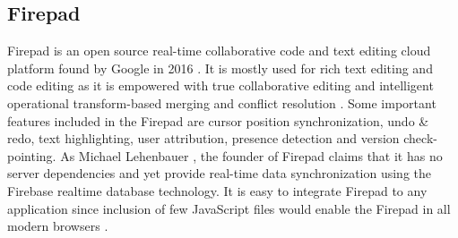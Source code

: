 \subsection{Firepad}

Firepad is an open source real-time collaborative code and text editing cloud platform found by Google in 2016 \cite{hid-sp18-409-www-firepad}.  It is mostly used for rich text editing and code editing as it is empowered with true collaborative editing and intelligent operational transform-based merging and conflict resolution \cite{hid-sp18-409-www-firepad-wikipedia}. Some important features included in the Firepad are cursor position synchronization, undo & redo, text highlighting, user attribution, presence detection and version check-pointing. As Michael Lehenbauer \cite{hid-sp18-409-www-firepad}, the founder of Firepad claims that it has no server dependencies and yet provide real-time data synchronization using the Firebase realtime database technology.  It is easy to integrate Firepad to any application since inclusion of few JavaScript files would enable the Firepad in all modern browsers \cite{hid-sp18-409-www-firepad}.